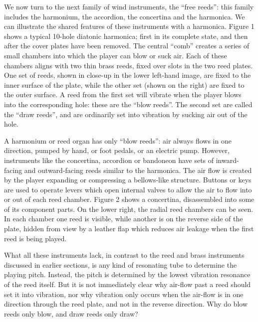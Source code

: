 

  We now turn to the next family of wind instruments, the ``free reeds'': this 
  family includes the harmonium, the accordion, the concertina and the 
  harmonica. We can illustrate the shared features of these instruments with a 
  harmonica. Figure 1 shows a typical 10-hole diatonic harmonica; first in its 
  complete state, and then after the cover plates have been removed. The 
  central “comb” creates a series of small chambers into which the player can 
  blow or suck air. Each of these chambers aligns with two thin brass reeds, 
  fixed over slots in the two reed plates. One set of reeds, shown in close-up 
  in the lower left-hand image, are fixed to the inner surface of the plate, 
  while the other set (shown on the right) are fixed to the outer surface. A 
  reed from the first set will vibrate when the player blows into the 
  corresponding hole: these are the “blow reeds”. The second set are called the 
  “draw reeds”, and are ordinarily set into vibration by sucking air out of the 
  hole. 

  A harmonium or reed organ has only “blow reeds”: air always flows in one 
  direction, pumped by hand, or foot pedals, or an electric pump. However, 
  instruments like the concertina, accordion or bandoneon have sets of 
  inward-facing and outward-facing reeds similar to the harmonica. The air flow 
  is created by the player expanding or compressing a bellows-like structure. 
  Buttons or keys are used to operate levers which open internal valves to 
  allow the air to flow into or out of each reed chamber. Figure 2 shows a 
  concertina, disassembled into some of its component parts. On the lower 
  right, the radial reed chambers can be seen. In each chamber one reed is 
  visible, while another is on the reverse side of the plate, hidden from view 
  by a leather flap which reduces air leakage when the first reed is being 
  played. 

  What all these instruments lack, in contrast to the reed and brass 
  instruments discussed in earlier sections, is any kind of resonating tube to 
  determine the playing pitch. Instead, the pitch is determined by the lowest 
  vibration resonance of the reed itself. But it is not immediately clear why 
  air-flow past a reed should set it into vibration, nor why vibration only 
  occurs when the air-flow is in one direction through the reed plate, and not 
  in the reverse direction. Why do blow reeds only blow, and draw reeds only 
  draw? 

